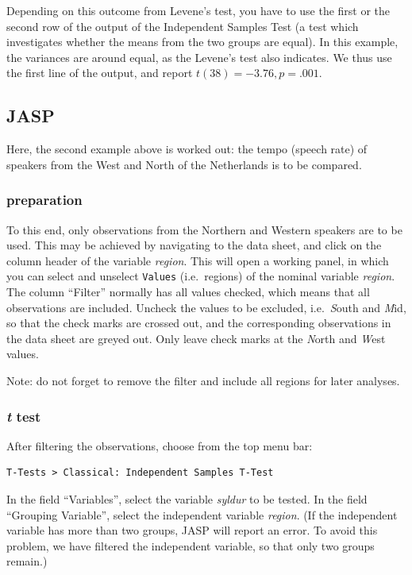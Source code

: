 \documentclass[
]{book}
\begin{document}
Depending on this outcome from Levene's test, you have to use the first
or the second row of the output of the Independent Samples Test
(a test which investigates whether the means from the two groups are equal).
In this example, the variances are around equal, as the
Levene's test also indicates. We thus use the first line of the output,
and report \(t(38)=-3.76, p=.001\).

\subsection{JASP}\label{sec:JASP-ttest-unpaired}

Here, the second example above is worked out: the tempo (speech rate) of speakers from the West and North of the Netherlands is to be compared.

\subsubsection{preparation}\label{preparation}

To this end, only observations from the Northern and Western speakers are to be used. This may be achieved by navigating to the data sheet, and click on the column header of the variable \emph{region}. This will open a working panel, in which you can select and unselect \texttt{Values} (i.e.~regions) of the nominal variable \emph{region}. The column ``Filter'' normally has all values checked, which means that all observations are included. Uncheck the values to be excluded, i.e.~\emph{S}outh and \emph{M}id, so that the check marks are crossed out, and the corresponding observations in the data sheet are greyed out. Only leave check marks at the \emph{N}orth and \emph{W}est values.

Note: do not forget to remove the filter and include all regions for later analyses.

\subsubsection{\texorpdfstring{\emph{t} test}{t test}}\label{t-test}

After filtering the observations, choose from the top menu bar:

\begin{verbatim}
T-Tests > Classical: Independent Samples T-Test
\end{verbatim}

In the field ``Variables'', select the variable \emph{syldur} to be tested.
In the field ``Grouping Variable'', select the independent variable \emph{region}. (If the independent variable has more than two groups, JASP will report an error. To avoid this problem, we have filtered the independent variable, so that only two groups remain.)
\end{document}
